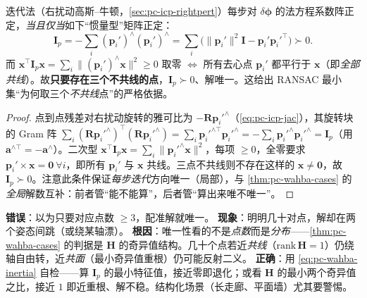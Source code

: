 \begin{theorem}\label{thm:pc-wahba-suff}
迭代法（右扰动高斯--牛顿，\cref{sec:pc-icp-rightpert}）每步对 $\delta\boldsymbol{\phi}$ 的法方程系数阵正定，\emph{当且仅当}如下“惯量型”矩阵正定：
\begin{equation}
  \mathbf{I}_p=-\sum_i (\mathbf{p}_i')^\wedge(\mathbf{p}_i')^\wedge=\sum_i\big(\|\mathbf{p}_i'\|^2\mathbf{I}-\mathbf{p}_i'\mathbf{p}_i'^\top\big)\succ0.
  \label{eq:pc-wahba-inertia}
\end{equation}
而 $\mathbf{x}^\top\mathbf{I}_p\mathbf{x}=\sum_i\|(\mathbf{p}_i')^\wedge\mathbf{x}\|^2\ge0$ 取零 $\iff$ 所有去心点 $\mathbf{p}_i'$ 都平行于 $\mathbf{x}$（即\emph{全部共线}）。故\textbf{只要存在三个不共线的点}，$\mathbf{I}_p\succ0$、解唯一。这给出 RANSAC 最小集“为何取三个\emph{不共线}点”的严格依据。
\end{theorem}

\begin{proof}
点到点残差对右扰动旋转的雅可比为 $-\mathbf{R}\mathbf{p}_i'^\wedge$（\cref{eq:pc-icp-jac}），其旋转块的 Gram 阵 $\sum_i(\mathbf{R}\mathbf{p}_i'^\wedge)^\top(\mathbf{R}\mathbf{p}_i'^\wedge)=\sum_i\mathbf{p}_i'^{\wedge\top}\mathbf{p}_i'^\wedge=-\sum_i\mathbf{p}_i'^\wedge\mathbf{p}_i'^\wedge=\mathbf{I}_p$（用 $\mathbf{a}^{\wedge\top}=-\mathbf{a}^\wedge$）。二次型 $\mathbf{x}^\top\mathbf{I}_p\mathbf{x}=\sum_i\|\mathbf{p}_i'^\wedge\mathbf{x}\|^2$，每项 $\ge0$，全零要求 $\mathbf{p}_i'\times\mathbf{x}=\mathbf{0}\ \forall i$，即所有 $\mathbf{p}_i'$ 与 $\mathbf{x}$ 共线。三点不共线则不存在这样的 $\mathbf{x}\ne\mathbf{0}$，故 $\mathbf{I}_p\succ0$。注意此条件保证\emph{每步迭代}方向唯一（局部），与 \cref{thm:pc-wahba-cases} 的\emph{全局}解数互补：前者管“能不能算”，后者管“算出来唯不唯一”。
\end{proof}

\begin{pitfall}
\textbf{错误}：以为只要对应点数 $\ge3$，配准解就唯一。
\textbf{现象}：明明几十对点，解却在两个姿态间跳（或绕某轴漂）。
\textbf{根因}：唯一性看的不是\emph{点数}而是\emph{分布}——\cref{thm:pc-wahba-cases} 的判据是 $\mathbf{H}$ 的奇异值结构。几十个点若近\emph{共线}（$\mathrm{rank}\,\mathbf{H}=1$）仍绕轴自由转，近\emph{共面}（最小奇异值重根）仍可能反射二义。
\textbf{正确}：用 \cref{eq:pc-wahba-inertia} 自检——算 $\mathbf{I}_p$ 的最小特征值，接近零即退化；或看 $\mathbf{H}$ 的最小两个奇异值之比，接近 $1$ 即近重根、解不稳。结构化场景（长走廊、平面墙）尤其要警惕。
\end{pitfall}

